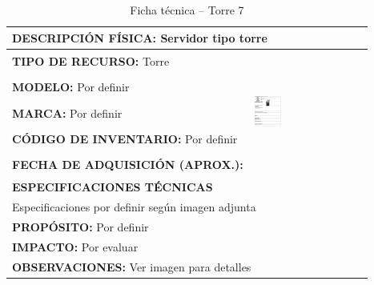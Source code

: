 \begin{table}[H]
\centering
\caption{Ficha técnica -- Torre 7}
\label{tab:torre-7}
\begin{tabular}{|p{}|p{}|}
\hline
\multicolumn{2}{|l|}{\textbf{DESCRIPCIÓN FÍSICA:} Servidor tipo torre} \\ \hline
\textbf{TIPO DE RECURSO:} Torre & 
\multirow{5}{*}{\includegraphics[width=0.25\textwidth,height=4cm,keepaspectratio]{tablas-images/cp1/torres/torre-7.png}} \\ \cline{1-1}
\textbf{MODELO:} Por definir & \\ \cline{1-1}
\textbf{MARCA:} Por definir & \\ \cline{1-1}
\textbf{CÓDIGO DE INVENTARIO:} Por definir & \\ \cline{1-1}
\textbf{FECHA DE ADQUISICIÓN (APROX.):} & \\ \hline
\multicolumn{2}{|l|}{\textbf{ESPECIFICACIONES TÉCNICAS}} \\ \hline
\multicolumn{2}{|p{0.95\textwidth}|}{
\footnotesize
Especificaciones por definir según imagen adjunta
} \\ \hline
\multicolumn{2}{|l|}{\textbf{PROPÓSITO:} Por definir} \\ \hline
\multicolumn{2}{|l|}{\textbf{IMPACTO:} Por evaluar} \\ \hline
\multicolumn{2}{|l|}{\textbf{OBSERVACIONES:} Ver imagen para detalles} \\ \hline
\end{tabular}
\end{table}

